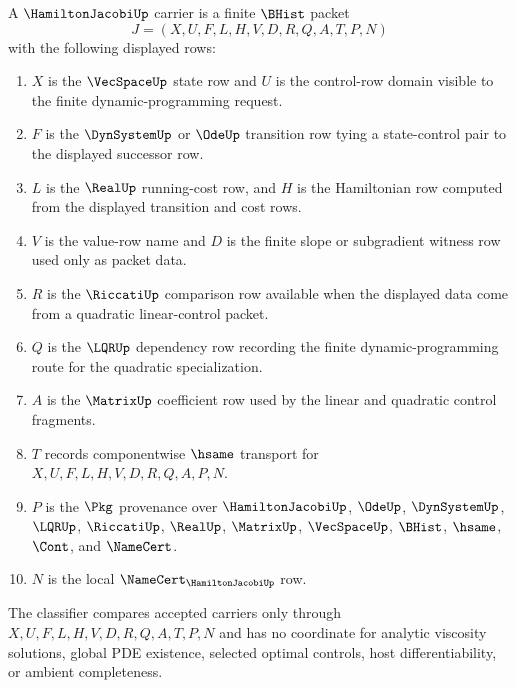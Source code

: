 \begin{definition}
\label{def:hamilton-jacobi-carrier}
A $\HamiltonJacobiUp$ carrier is a finite $\BHist$ packet
$$
J=(X,U,F,L,H,V,D,R,Q,A,T,P,N)
$$
with the following displayed rows:
\begin{enumerate}
\item $X$ is the $\VecSpaceUp$ state row and $U$ is the control-row domain visible to the finite dynamic-programming request.
\item $F$ is the $\DynSystemUp$ or $\OdeUp$ transition row tying a state-control pair to the displayed successor row.
\item $L$ is the $\RealUp$ running-cost row, and $H$ is the Hamiltonian row computed from the displayed transition and cost rows.
\item $V$ is the value-row name and $D$ is the finite slope or subgradient witness row used only as packet data.
\item $R$ is the $\RiccatiUp$ comparison row available when the displayed data come from a quadratic linear-control packet.
\item $Q$ is the $\LQRUp$ dependency row recording the finite dynamic-programming route for the quadratic specialization.
\item $A$ is the $\MatrixUp$ coefficient row used by the linear and quadratic control fragments.
\item $T$ records componentwise $\hsame$ transport for $X,U,F,L,H,V,D,R,Q,A,P,N$.
\item $P$ is the $\Pkg$ provenance over $\HamiltonJacobiUp$, $\OdeUp$, $\DynSystemUp$, $\LQRUp$, $\RiccatiUp$, $\RealUp$, $\MatrixUp$, $\VecSpaceUp$, $\BHist$, $\hsame$, $\Cont$, and $\NameCert$.
\item $N$ is the local $\NameCert_{\HamiltonJacobiUp}$ row.
\end{enumerate}
The classifier compares accepted carriers only through $X,U,F,L,H,V,D,R,Q,A,T,P,N$ and has no coordinate for analytic viscosity solutions, global PDE existence, selected optimal controls, host differentiability, or ambient completeness.
\end{definition}

